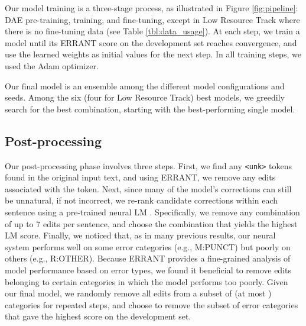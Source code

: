\documentclass[11pt,a4paper]{article}
\begin{document}
Our model training is a three-stage process, as illustrated in Figure \ref{fig:pipeline}: DAE pre-training, training, and fine-tuning, except in Low Resource Track where there is no fine-tuning data (see Table \ref{tbl:data_usage}). 
At each step, we train a model until its ERRANT score on the development set reaches convergence, and use the learned weights as initial values for the next step. 
In all training steps, we used the Adam \cite{kingma2014adam} optimizer.

Our final model is an ensemble among the different model configurations and seeds. 
Among the six (four for Low Resource Track) best models, we greedily search for the best combination, starting with the best-performing single model. 

\subsection{Post-processing}

Our post-processing phase involves three steps.
First, we find any \texttt{<unk>} tokens found in the original input text, and using ERRANT, we remove any edits associated with the token.
Next, since many of the model's corrections can still be unnatural, if not incorrect, we re-rank candidate corrections within each sentence using a pre-trained neural LM \cite{dauphin2017language}. 
Specifically, we remove any combination of up to 7 edits per sentence, and choose the combination that yields the highest LM score. 
Finally, we noticed that, as in many previous results, our neural system performs well on some error categories (e.g., M:PUNCT) but poorly on others (e.g., R:OTHER). 
Because ERRANT provides a fine-grained analysis of model performance based on error types, we found it beneficial to remove edits belonging to certain categories in which the model performs too poorly. 
Given our final model, we randomly remove all edits from a subset of (at most ) categories for repeated steps, and choose to remove the subset of error categories that gave the highest score on the development set. 
\end{document}
